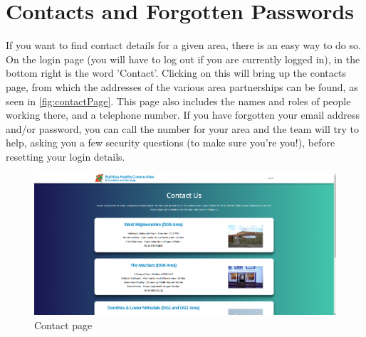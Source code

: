 \documentclass{bhcguides}
\begin{document}
\pagebreak

\section{Contacts and Forgotten Passwords}
\label{sec:contacts}

If you want to find contact details for a given area, there is an easy way to do so. On the login page (you will have to log out if you are currently logged in), in the bottom right is the word 'Contact'. Clicking on this will bring up the contacts page, from which the addresses of the various area partnerships can be found, as seen in \autoref{fig:contactPage}. This page also includes the names and roles of people working there, and a telephone number. If you have forgotten your email address and/or password, you can call the number for your area and the team will try to help, asking you a few security questions (to make sure you're you!), before resetting your login details.

\begin{figure}[h]
 \centerline{\includegraphics[width=\textwidth, height=\textheight, keepaspectratio]{contactpage.png}}
 \caption{Contact page}
 \label{fig:contactPage}
\end{figure}
\end{document}

